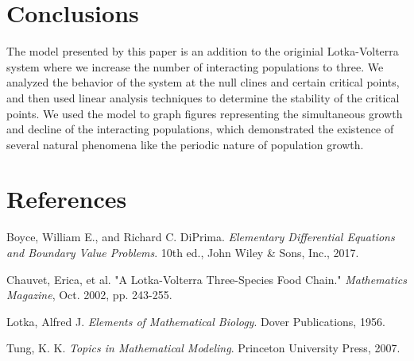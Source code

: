 \documentclass[11pt,oneside]{article}
\begin{document}
	
	\section{Conclusions}
	The model presented by this paper is an addition to the originial Lotka-Volterra system where we increase the number of interacting populations to three. We analyzed the behavior of the system at the null clines and certain critical points, and then used linear analysis techniques to determine the stability of the critical points. We used the model to graph figures representing the simultaneous growth and decline of the interacting populations, which demonstrated the existence of several natural phenomena like the periodic nature of population growth.
	
	
	\section{References}
	\begin{hangparas}{.25in}{1}
		Boyce, William E., and Richard C. DiPrima. \textit{Elementary Differential Equations and Boundary Value Problems}. 10th ed., John Wiley \& Sons, Inc., 2017.
		
		Chauvet, Erica, et al. "A Lotka-Volterra Three-Species Food Chain." \textit{Mathematics Magazine}, Oct. 2002, pp. 243-255.
		
		Lotka, Alfred J. \textit{Elements of Mathematical Biology}. Dover Publications, 1956.
		
		Tung, K. K. \textit{Topics in Mathematical Modeling}. Princeton University Press, 2007.
		
		
	\end{hangparas}
	
\end{document}
